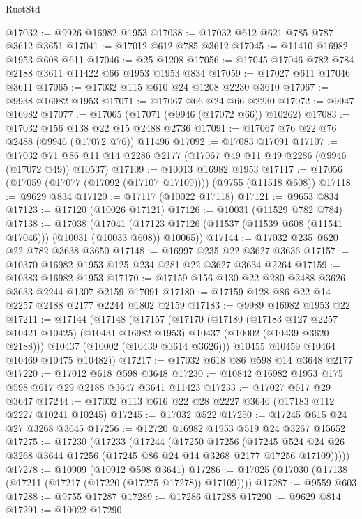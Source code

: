 \begin{lexlean}{RustStd}
\begin{coremodule}
@17032 := @9926 @16982 @1953
@17038 := @17032 @612 @621 @785 @787 @3612 @3651
@17041 := @17012 @612 @785 @3612
@17045 := @11410 @16982 @1953 @608 @611
@17046 := @25 @1208
@17056 := @17045 @17046 @782 @784 @2188 @3611 @11422 @66 @1953 @1953 @834
@17059 := @17027 @611 @17046 @3611
@17065 := @17032 @115 @610 @24 @1208 @2230 @3610
@17067 := @9938 @16982 @1953
@17071 := @17067 @66 @24 @66 @2230
@17072 := @9947 @16982
@17077 := @17065 (@17071 (@9946 (@17072 @66)) @10262)
@17083 := @17032 @156 @138 @22 @15 @2488 @2736
@17091 := @17067 @76 @22 @76 @2488 (@9946 (@17072 @76)) @11496
@17092 := @17083 @17091
@17107 := @17032 @71 @86 @11 @14 @2286 @2177 (@17067 @49 @11 @49 @2286 (@9946 (@17072 @49)) @10537)
@17109 := @10013 @16982 @1953
@17117 := @17056 (@17059 (@17077 (@17092 (@17107 @17109)))) (@9755 (@11518 @608))
@17118 := @9629 @834
@17120 := @17117 (@10022 @17118)
@17121 := @9653 @834
@17123 := @17120 (@10026 @17121)
@17126 := @10031 (@11529 @782 @784)
@17138 := @17038
    (@17041 (@17123 @17126 (@11537 (@11539 @608 (@11541 @17046))) (@10031 (@10033 @608)) @10065))
@17144 := @17032 @235 @620 @22 @782 @3638 @3650
@17148 := @16997 @235 @22 @3627 @3636
@17157 := @10370 @16982 @1953 @125 @234 @281 @22 @3627 @3634 @2264
@17159 := @10383 @16982 @1953
@17170 := @17159 @156 @130 @22 @280 @2488 @3626 @3633 @2244 @1307 @2159 @17091
@17180 := @17159 @128 @86 @22 @14 @2257 @2188 @2177 @2244 @1802 @2159
@17183 := @9989 @16982 @1953 @22
@17211 := @17144
    (@17148
      (@17157
        (@17170
          (@17180
            (@17183 @127 @2257 @10421 @10425)
            (@10431 @16982 @1953)
            @10437
            (@10002 (@10439 @3620 @2188)))
          @10437
          (@10002 (@10439 @3614 @3626)))
        @10455
        @10459
        @10464
        @10469
        @10475
        @10482))
@17217 := @17032 @618 @86 @598 @14 @3648 @2177
@17220 := @17012 @618 @598 @3648
@17230 := @10842 @16982 @1953 @175 @598 @617 @29 @2188 @3647 @3641 @11423
@17233 := @17027 @617 @29 @3647
@17244 := @17032 @113 @616 @22 @28 @2227 @3646 (@17183 @112 @2227 @10241 @10245)
@17245 := @17032 @522
@17250 := @17245 @615 @24 @27 @3268 @3645
@17256 := @12720 @16982 @1953 @519 @24 @3267 @15652
@17275 := @17230
    (@17233
      (@17244
        (@17250
          @17256
          (@17245 @524 @24 @26 @3268 @3644 @17256 (@17245 @86 @24 @14 @3268 @2177 @17256 @17109)))))
@17278 := @10909 (@10912 @598 @3641)
@17286 := @17025 (@17030 (@17138 (@17211 (@17217 (@17220 (@17275 @17278)) @17109))))
@17287 := @9559 @603
@17288 := @9755 @17287
@17289 := @17286 @17288
@17290 := @9629 @814
@17291 := @10022 @17290

\end{coremodule}
\end{lexlean}
